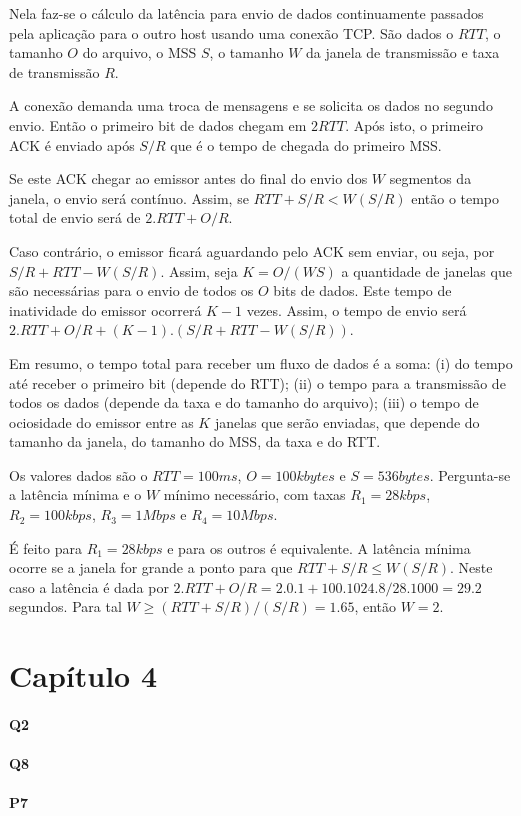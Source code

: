 Nela faz-se o cálculo da latência para envio de dados continuamente passados pela aplicação para o outro host usando uma conexão TCP.
São dados o $RTT$, o tamanho $O$ do arquivo, o MSS $S$, o tamanho $W$ da janela de transmissão e taxa de transmissão $R$.

A conexão demanda uma troca de mensagens e se solicita os dados no segundo envio. Então o primeiro bit de dados chegam em $2RTT$.
Após isto, o primeiro ACK é enviado após $S/R$ que é o tempo de chegada do primeiro MSS.

Se este ACK chegar ao emissor antes do final do envio dos $W$ segmentos da janela, o envio será contínuo.
Assim, se $RTT + S/R < W(S/R)$ então o tempo total de envio será de $2.RTT + O/R$.

Caso contrário, o emissor ficará aguardando pelo ACK sem enviar, ou seja, por $S/R + RTT - W(S/R)$.
Assim, seja $K = O/(WS)$ a quantidade de janelas que são necessárias para o envio de todos os $O$ bits de dados.
Este tempo de inatividade do emissor ocorrerá $K-1$ vezes.
Assim, o tempo de envio será $2.RTT + O/R + (K-1).(S/R + RTT - W(S/R))$.

Em resumo, o tempo total para receber um fluxo de dados é a soma: 
(i) do tempo até receber o primeiro bit (depende do RTT); 
(ii) o tempo para a transmissão de todos os dados (depende da taxa e do tamanho do arquivo);
(iii) o tempo de ociosidade do emissor entre as $K$ janelas que serão enviadas, que depende do tamanho da janela, do tamanho do MSS, da taxa e do RTT.

Os valores dados são o $RTT = 100ms$, $O = 100kbytes$ e $S = 536 bytes$.
Pergunta-se a latência mínima e o $W$ mínimo necessário, com taxas $R_1 = 28kbps$, $R_2 = 100kbps$, $R_3 = 1Mbps$ e $R_4 = 10 Mbps$.

É feito para $R_1 = 28kbps$ e para os outros é equivalente.
A latência mínima ocorre se a janela for grande a ponto para que $RTT + S/R \le W(S/R)$.
Neste caso a latência é dada por $2.RTT + O/R = 2.0.1 + 100.1024.8/28.1000 = 29.2$ segundos.
Para tal $W \ge (RTT + S/R)/(S/R) = 1.65$, então $W = 2$.
\section{Capítulo 4}

\paragraph{Q2}


\paragraph{Q8}


\paragraph{P7}


